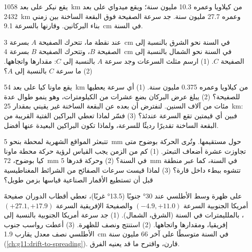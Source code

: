 \begin{exercise}[$\star\star$]\label{exo:g11:plate-motions:10}
يقع نيكر على بعد \qty{1058}{km} من كيلاويا وعمره \num{10.3} مليون سنة؛
ويقع ميدواي على بعد \qty{2432}{km} وعمره \num{27.7} مليون سنة. جد
سرعة الصفيحة فوق البقعة الساخنة بين زمني بناء البركانين.
وقارنها بالسرعة \qty{9.1}{cm} في السنة.
\end{exercise}

\begin{exercise}[$\star\star$]\label{exo:g11:plate-motions:11}
عند نقطة ما، تتحرك الصفيحة $A$ بسرعة \qty{3}{cm} في السنة نحو الشرق بالنسبة إلى الصفيحة $B$،
وتتحرك الصفيحة $B$ بسرعة \qty{4}{cm} في السنة نحو الشمال بالنسبة إلى الصفيحة $C$.
(1) ارسم مثلث السرعات وجد سرعة $A$ بالنسبة إلى $C$:
مقدارها واتجاهها. (2) ما سرعة $C$ بالنسبة إلى $A$؟
\end{exercise}

\begin{exercise}[$\star\star\star$]\label{exo:g11:plate-motions:12}
يقع ماونا كيا على بعد \qty{54}{km} من كيلاويا وعمره \num{0.375} مليون
سنة. (1) أي سرعة يعطيها للصفيحة؟ (2) يبلغ عرض البركان بضع عشرات من
الكيلومترات، وهو ينمو طوال عدة مئات من آلاف السنين. لنفترض أن
بعده عن البقعة الساخنة غير يقيني بمقدار \qty{25}{km}: فبين أي
قيمتين تقع السرعة عندئذ؟ (3) فسّر لماذا تعطي البراكين الفتية القريبة من
البقعة الساخنة تقديرًا رديئًا للسرعة، ولماذا تكون البراكين البعيدة عنها
أفضل.
\end{exercise}

\begin{exercise}[$\star\star\star$]\label{exo:g11:plate-motions:13}
تتبعثر المواقع الشهرية لمحطة بنحو \qty{5}{mm} حول
مستقيمها. وتُرى الحركة بوضوح متى تجاوزت عشرة أضعاف التبعثر.
(1) كم من الزمن يجب القياس لرؤية حركة محطة ماونا كيا بوضوح،
\qty{72}{mm} في السنة؟ (2) وحركة قدرها \qty{5}{mm} في السنة، كما
عبر منطقة تتشوه ببطء داخل قارة؟ (3) لماذا قيست سرعات
الصفائح من الشرائط المغناطيسية قبل أن تستطيع الأقمار الصناعية قياسها
بزمن طويل؟
\end{exercise}

\begin{exercise}[$\star\star\star$]\label{exo:g11:plate-motions:14}
على ظهرة وسط الأطلسي عند \ang{30} جنوبًا (\ang{13.5} غربًا)، تعطي أقطاب
الدوران صفيحةَ أمريكا الجنوبية السرعة $(-4.9, +11.0)$ والصفيحةَ
الإفريقية السرعة $(+27.1, +17.9)$، بالملليمترات في السنة (الشرق، الشمال).
(1) جد سرعة أمريكا الجنوبية بالنسبة إلى إفريقيا، ومقدارها
واتجاهها. (2) استنتج  ونصف  للظهرة.
(3) أعطت رواسب جنوب الأطلسي نصف معدل يقارب \qty{1.9}{cm}
في السنة متوسطًا على آخر 66 مليون سنة
(\cref{ch:g11:drift-to-spreading}). قارن، واقترح ما قد يعنيه
الفرق.
\end{exercise}

